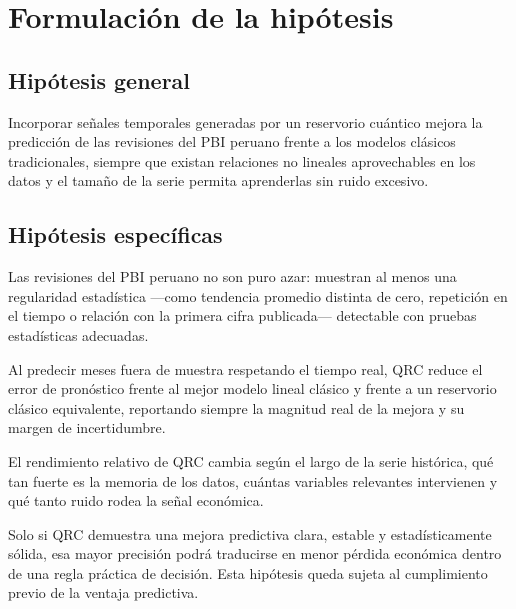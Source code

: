 \section{Formulación de la hipótesis}

\subsection{Hipótesis general}

Incorporar señales temporales generadas por un reservorio cuántico mejora la predicción de las revisiones del PBI peruano frente a los modelos clásicos tradicionales, siempre que existan relaciones no lineales aprovechables en los datos y el tamaño de la serie permita aprenderlas sin ruido excesivo.

\subsection{Hipótesis específicas}

\begin{hypothesis}
	Las revisiones del PBI peruano no son puro azar: muestran al menos una regularidad estadística —como tendencia promedio distinta de cero, repetición en el tiempo o relación con la primera cifra publicada— detectable con pruebas estadísticas adecuadas.
\end{hypothesis}

\begin{hypothesis}
	Al predecir meses fuera de muestra respetando el tiempo real, QRC reduce el error de pronóstico frente al mejor modelo lineal clásico y frente a un reservorio clásico equivalente, reportando siempre la magnitud real de la mejora y su margen de incertidumbre.
\end{hypothesis}

\begin{hypothesis}
	El rendimiento relativo de QRC cambia según el largo de la serie histórica, qué tan fuerte es la memoria de los datos, cuántas variables relevantes intervienen y qué tanto ruido rodea la señal económica.
\end{hypothesis}

\begin{hypothesis}
	Solo si QRC demuestra una mejora predictiva clara, estable y estadísticamente sólida, esa mayor precisión podrá traducirse en menor pérdida económica dentro de una regla práctica de decisión. Esta hipótesis queda sujeta al cumplimiento previo de la ventaja predictiva.
\end{hypothesis}

